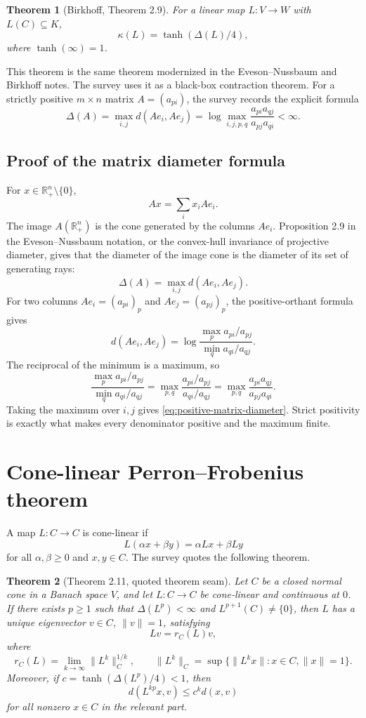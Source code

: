 \documentclass[11pt]{article}
\newtheorem{theorem}{Theorem}
\newcommand{\R}{\mathbb{R}}
\begin{document}
\begin{theorem}[Birkhoff, Theorem 2.9]
For a linear map \(L:V\to W\) with \(L(C)\subseteq K\),
\[
  \kappa(L)=\tanh(\Delta(L)/4),
\]
where \(\tanh(\infty)=1\).
\end{theorem}

This theorem is the same theorem modernized in the Eveson--Nussbaum and Birkhoff notes.  The survey uses it as a black-box contraction theorem.  For a strictly positive \(m\times n\) matrix \(A=(a_{pi})\), the survey records the explicit formula
\begin{equation}
  \Delta(A)=\max_{i,j} d(Ae_i,Ae_j)
  =\log\max_{i,j,p,q}\frac{a_{pi}a_{qj}}{a_{pj}a_{qi}}<\infty.
  \label{eq:positive-matrix-diameter}
\end{equation}

\subsection{Proof of the matrix diameter formula}
For \(x\in\R_+^n\setminus\{0\}\),
\[
  Ax=\sum_i x_i Ae_i.
\]
The image \(A(\R_+^n)\) is the cone generated by the columns \(Ae_i\).  Proposition 2.9 in the Eveson--Nussbaum notation, or the convex-hull invariance of projective diameter, gives that the diameter of the image cone is the diameter of its set of generating rays:
\[
  \Delta(A)=\max_{i,j}d(Ae_i,Ae_j).
\]
For two columns \(Ae_i=(a_{pi})_p\) and \(Ae_j=(a_{pj})_p\), the positive-orthant formula gives
\[
  d(Ae_i,Ae_j)=
  \log\frac{\max_p a_{pi}/a_{pj}}{\min_q a_{qi}/a_{qj}}.
\]
The reciprocal of the minimum is a maximum, so
\[
  \frac{\max_p a_{pi}/a_{pj}}{\min_q a_{qi}/a_{qj}}
  =\max_{p,q}\frac{a_{pi}/a_{pj}}{a_{qi}/a_{qj}}
  =\max_{p,q}\frac{a_{pi}a_{qj}}{a_{pj}a_{qi}}.
\]
Taking the maximum over \(i,j\) gives \eqref{eq:positive-matrix-diameter}.  Strict positivity is exactly what makes every denominator positive and the maximum finite.

\section{Cone-linear Perron--Frobenius theorem}
A map \(L:C\to C\) is cone-linear if
\[
  L(\alpha x+\beta y)=\alpha Lx+\beta Ly
\]
for all \(\alpha,\beta\ge0\) and \(x,y\in C\).  The survey quotes the following theorem.

\begin{theorem}[Theorem 2.11, quoted theorem seam]
Let \(C\) be a closed normal cone in a Banach space \(V\), and let \(L:C\to C\) be cone-linear and continuous at \(0\).  If there exists \(p\ge1\) such that \(\Delta(L^p)<\infty\) and \(L^{p+1}(C)\ne\{0\}\), then \(L\) has a unique eigenvector \(v\in C\), \(\|v\|=1\), satisfying
\[
  Lv=r_C(L)v,
\]
where
\[
  r_C(L)=\lim_{k\to\infty}\|L^k\|_C^{1/k},
  \qquad
  \|L^k\|_C=\sup\{\|L^k x\|:x\in C,\|x\|=1\}.
\]
Moreover, if \(c=\tanh(\Delta(L^p)/4)<1\), then
\[
  d(L^{kp}x,v)\le c^k d(x,v)
\]
for all nonzero \(x\in C\) in the relevant part.
\end{theorem}
\end{document}
